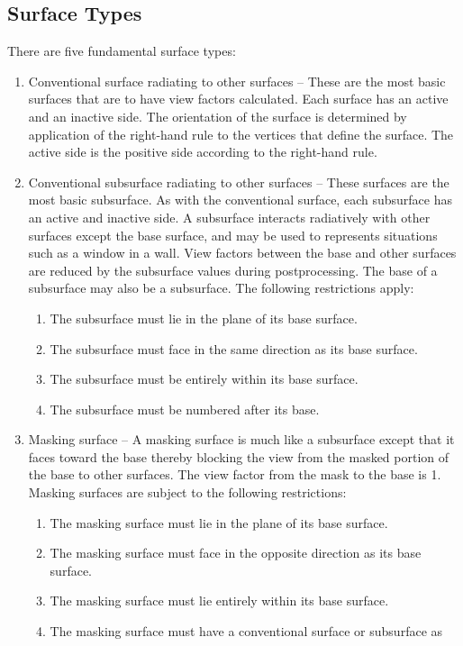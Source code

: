 \documentclass[10pt]{article}
\begin{document}
\subsection{Surface Types}
There are five fundamental surface types:
\begin{enumerate}
\item Conventional surface radiating to other surfaces – These are the most
basic surfaces that are to have view factors calculated.  Each surface has an
active and an inactive side.  The orientation of the surface is determined by
application of the right-hand rule to the vertices that define the surface.
The active side is the positive side according to the right-hand rule.
\item Conventional subsurface radiating to other surfaces – These surfaces are
the most basic subsurface.  As with the conventional surface, each subsurface
has an active and inactive side.  A subsurface interacts radiatively with other
surfaces except the base surface, and may be used to represents situations such
as a window in a wall.  View factors between the base and other surfaces are
reduced by the subsurface values during postprocessing.  The base of a
subsurface may also be a subsurface.  The following restrictions apply:
\begin{enumerate}
   \item The subsurface must lie in the plane of its base surface.
   \item The subsurface must face in the same direction as its base surface.
   \item The subsurface must be entirely within its base surface.
   \item The subsurface must be numbered after its base.
\end{enumerate}
\item Masking surface – A masking surface is much like a subsurface except that
it faces toward the base thereby blocking the view from the masked portion of
the base to other surfaces. The view factor from the mask to the base is 1. 
Masking surfaces are subject to the following restrictions:
\begin{enumerate}
   \item The masking surface must lie in the plane of its base surface.
   \item The masking surface must face in the opposite direction as its base
   surface.
   \item The masking surface must lie entirely within its base surface.
   \item The masking surface must have a conventional surface or subsurface as

\end{enumerate}
\end{enumerate}
\end{document}
